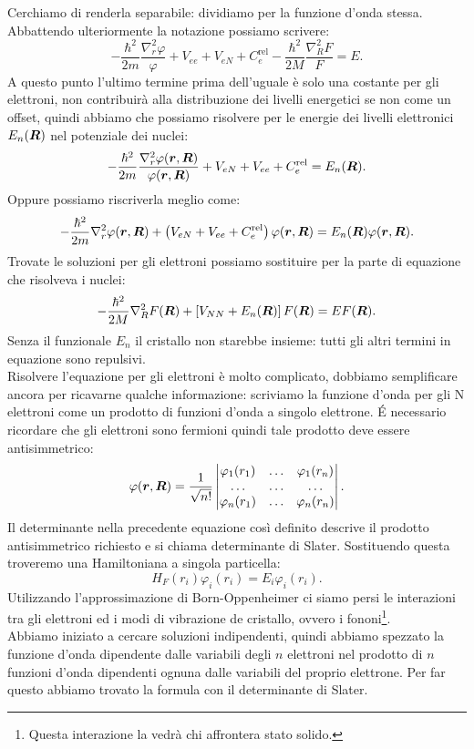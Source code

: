 Cerchiamo di renderla separabile: dividiamo per la funzione d'onda stessa. Abbattendo ulteriormente la notazione possiamo scrivere:
\[
	-\frac{\hbar ^2}{2m}\frac{\nabla_r^2\varphi}{\varphi} +
	V_{ee} + V _{eN} + C_e^{\text{rel}} -
	\frac{\hbar ^2}{2M}\frac{\nabla_R^2F}{F} = E
.\] 
A questo punto l'ultimo termine prima dell'uguale è solo una costante per gli elettroni, non contribuirà alla distribuzione dei livelli energetici se non come un offset, quindi abbiamo che possiamo risolvere per le energie dei livelli elettronici $E_n(\boldsymbol{R})$ nel potenziale dei nuclei:
\[
	-\frac{\hbar ^2}{2m}
	\frac{\nabla_r^2 \varphi(\boldsymbol{r},\boldsymbol{R})}{\varphi(\boldsymbol{r},\boldsymbol{R})} +
	V_{eN} + V_{ee} + C_e^{\text{rel}} = E_n(\boldsymbol{R})
.\] 
Oppure possiamo riscriverla meglio come:
\[
	-\frac{\hbar ^2}{2m}
	\nabla_r^2 \varphi(\boldsymbol{r},\boldsymbol{R}) +
	\left( V_{eN} + V_{ee} + C_e^{\text{rel}} \right)
	\varphi(\boldsymbol{r},\boldsymbol{R}) = E_n(\boldsymbol{R})\varphi(\boldsymbol{r}, \boldsymbol{R})
.\] 
Trovate le soluzioni per gli elettroni possiamo sostituire per la parte di equazione che risolveva i nuclei:
\[
	-\frac{\hbar ^2}{2M}\nabla_R^2F(\boldsymbol{R})+
	\left[ V_{NN}+E_n(\boldsymbol{R}) \right] F(\boldsymbol{R})=
	E F(\boldsymbol{R})
.\] 
Senza il funzionale $E_n$ il cristallo non starebbe insieme: tutti gli altri termini in equazione sono repulsivi.\\
Risolvere l'equazione per gli elettroni è molto complicato, dobbiamo semplificare ancora per ricavarne qualche informazione: scriviamo la funzione d'onda per gli N elettroni come un prodotto di funzioni d'onda a singolo elettrone. É necessario ricordare che gli elettroni sono fermioni quindi tale prodotto deve essere antisimmetrico:
\[
	\varphi(\boldsymbol{r},\boldsymbol{R}) =
	\frac{1}{\sqrt{n!}}
	\begin{vmatrix}
		\varphi_1(r_1) 	& \ldots 	& \varphi_1(r_n)\\
		\ldots		& \ldots	&\ldots	\\
		\varphi_n(r_1)	&\ldots		& \varphi_n(r_n)
	\end{vmatrix}
.\] 
Il determinante nella precedente equazione così definito descrive il prodotto antisimmetrico richiesto e si chiama determinante di Slater.
Sostituendo questa troveremo una Hamiltoniana a singola particella:
\[
	H_{F}(r_i)\varphi_i(r_i) = 
	E_i \varphi_i(r_i)
.\] 
Utilizzando l'approssimazione di Born-Oppenheimer ci siamo persi le interazioni tra gli elettroni ed i modi di vibrazione de cristallo, ovvero i fononi\footnote{Questa interazione la vedrà chi affrontera stato solido.}.\\
Abbiamo iniziato a cercare soluzioni indipendenti, quindi abbiamo spezzato la funzione d'onda dipendente dalle variabili degli $n$ elettroni nel prodotto di $n$ funzioni d'onda dipendenti ognuna dalle variabili del proprio elettrone. Per far questo abbiamo trovato la formula con il determinante di Slater.
